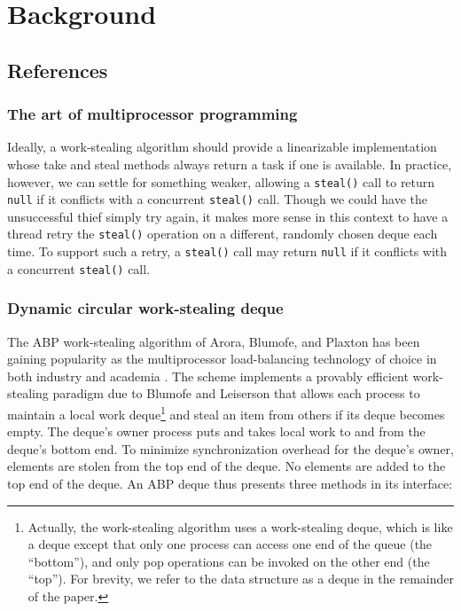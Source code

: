 
\chapter{Background}
\label{chap:queues-background}


\section{References}

\subsection{The art of multiprocessor programming \cite{Herlihy2008}}

Ideally, a work-stealing algorithm should provide a linearizable
implementation whose take and steal methods always return a task if
one is available. In practice, however, we can settle for something
weaker, allowing a \lstinline!steal()! call to return \lstinline!null!
if it conflicts with a concurrent \lstinline!steal()! call. Though we
could have the unsuccessful thief simply try again, it makes more
sense in this context to have a thread retry the \lstinline!steal()!
operation on a different, randomly chosen deque each time. To support
such a retry, a \lstinline!steal()! call may return \lstinline!null!
if it conflicts with a concurrent \lstinline!steal()! call.


\subsection{Dynamic circular work-stealing deque \cite{Chase2005}}

The ABP work-stealing algorithm of Arora, Blumofe, and Plaxton
\cite{Arora2001} has been gaining popularity as the multiprocessor
load-balancing technology of choice in both industry and academia
\cite{Arora2001, Acar2002, Blumofe1995, Frigo1998, Danaher2005}. The
scheme implements a provably efficient work-stealing paradigm due to
Blumofe and Leiserson \cite{Blumofe1999} that allows each process to
maintain a local work deque\footnote{Actually, the work-stealing
  algorithm uses a work-stealing deque, which is like a deque
  \cite{Knuth1997} except that only one process can access one end of
  the queue (the ``bottom''), and only pop operations can be invoked
  on the other end (the ``top'').  For brevity, we refer to the data
  structure as a deque in the remainder of the paper.} and steal an
item from others if its deque becomes empty. The deque's owner process
puts and takes local work to and from the deque's bottom end. To
minimize synchronization overhead for the deque's owner, elements are
stolen from the top end of the deque. No elements are added to the top
end of the deque. An ABP deque thus presents three methods in its
interface:

